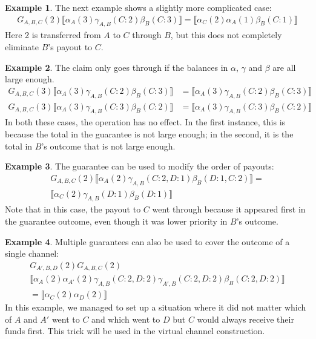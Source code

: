 \documentclass{article}
\theoremstyle{definition}
\newtheorem{example}{Example}[section]
\newcommand{\adj}[1]{\llbracket #1 \rrbracket}
\begin{document}
\begin{example}
  The next example shows a slightly more complicated case:
  \begin{align*}
    G_{A, B, C}(2)\adj{\alpha_A(3)\gamma_{A, B}(C: 2)\beta_B(C: 3)} = \adj{\alpha_C(2)\alpha_A(1)\beta_B(C:1)}
  \end{align*}
  Here 2 is transferred from $A$ to $C$ through $B$, but this does not completely eliminate $B$'s payout to $C$.
\end{example}

\begin{example}
  The claim only goes through if the balances in $\alpha$, $\gamma$ and $\beta$ are all large enough.
  \begin{align*}
    G_{A, B, C}(3)\adj{\alpha_A(3)\gamma_{A, B}(C: 2)\beta_B(C: 3)} &= \adj{\alpha_A(3)\gamma_{A, B}(C: 2)\beta_B(C: 3)} \\
    G_{A, B, C}(3)\adj{\alpha_A(3)\gamma_{A, B}(C: 3)\beta_B(C: 2)} &= \adj{\alpha_A(3)\gamma_{A, B}(C: 3)\beta_B(C: 2)}
  \end{align*}
  In both these cases, the operation has no effect.
  In the first instance, this is because the total in the guarantee is not large enough;
  in the second, it is the total in $B$'s outcome that is not large enough.
\end{example}

\begin{example}
  The guarantee can be used to modify the order of payouts:
  \begin{multline*}
    G_{A, B, C}(2)\adj{\alpha_A(2)\gamma_{A, B}(C: 2, D: 1)\beta_B(D: 1, C: 2)} =\\ \adj{\alpha_C(2)\gamma_{A, B}(D: 1)\beta_B(D: 1)}
  \end{multline*}
  Note that in this case, the payout to $C$ went through because it appeared first in the guarantee outcome, even though it was lower priority in $B$'s outcome.
\end{example}

\begin{example}
  Multiple guarantees can also be used to cover the outcome of a single channel:
  \begin{multline*}
    G_{A', B, D}(2)G_{A, B, C}(2)\\\adj{\alpha_A(2)\alpha_{A'}(2)\gamma_{A, B}(C: 2, D: 2)\gamma_{A', B}(C: 2, D: 2)\beta_B(C: 2, D: 2)}\\ = \adj{\alpha_C(2)\alpha_D(2)}
  \end{multline*}
  In this example, we managed to set up a situation where it did not matter which of $A$ and $A'$ went to $C$ and which went to $D$ but $C$ would always receive their funds first.
  This trick will be used in the virtual channel construction.
\end{example}
\end{document}
